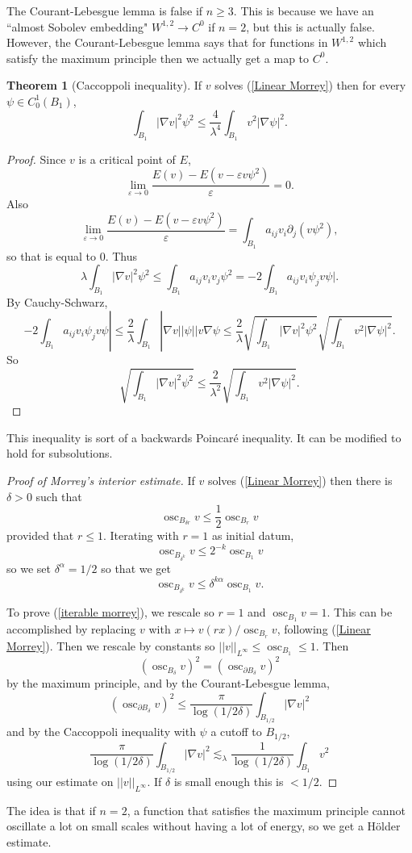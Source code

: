 \documentclass[12pt]{book}
\DeclareMathOperator{\osc}{osc}
\theoremstyle{definition}
\newtheorem{theorem}{Theorem}[chapter]
\begin{document}
The Courant-Lebesgue lemma is false if $n \geq 3$.
This is because we have an ``almost Sobolev embedding" $W^{1,2} \to C^0$ if $n = 2$, but this is actually false.
However, the Courant-Lebesgue lemma says that for functions in $W^{1,2}$ which satisfy the maximum principle then we actually get a map to $C^0$.

\begin{theorem}[Caccoppoli inequality]
If $v$ solves (\ref{Linear Morrey}) then for every $\psi \in C^1_0(B_1)$,
$$\int_{B_1} |\nabla v|^2 \psi^2 \leq \frac{4}{\lambda^4} \int_{B_1} v^2 |\nabla \psi|^2.$$
\end{theorem}
\begin{proof}
Since $v$ is a critical point of $E$,
$$\lim_{\varepsilon \to 0} \frac{E(v) - E(v - \varepsilon v\psi^2)}{\varepsilon} = 0.$$
Also
$$\lim_{\varepsilon \to 0}  \frac{E(v) - E(v - \varepsilon v\psi^2)}{\varepsilon} = \int_{B_1} a_{ij} v_i\partial_j(v\psi^2),$$
so that is equal to $0$.
Thus
$$\lambda \int_{B_1} |\nabla v|^2 \psi^2 \leq \int_{B_1} a_{ij} v_i v_j \psi^2 = -2\int_{B_1} a_{ij}v_i\psi_j v\psi|.$$
By Cauchy-Schwarz,
$$-2\int_{B_1} a_{ij}v_i\psi_j v\psi| \leq \frac{2}{\lambda} \int_{B_1} |\nabla v||\psi||v\nabla \psi \leq \frac{2}{\lambda} \sqrt{\int_{B_1} |\nabla v|^2 \psi^2} \sqrt{\int_{B_1} v^2 |\nabla \psi|^2}.$$
So
$$\sqrt{\int_{B_1} |\nabla v|^2 \psi^2} \leq \frac{2}{\lambda^2} \sqrt{\int_{B_1} v^2 |\nabla \psi|^2}.$$
\end{proof}
This inequality is sort of a backwards Poincar\'e inequality.
It can be modified to hold for subsolutions.

\begin{proof}[Proof of Morrey's interior estimate]
If $v$ solves (\ref{Linear Morrey}) then there is $\delta > 0$ such that
\begin{equation}
\label{iterable morrey}
\osc_{B_{\delta r}} v \leq \frac{1}{2} \osc_{B_r} v
\end{equation}
provided that $r \leq 1$.
Iterating with $r = 1$ as initial datum,
$$\osc_{B_{\delta^k}} v \leq 2^{-k} \osc_{B_1} v$$
so we set $\delta^\alpha = 1/2$ so that we get
$$\osc_{B_{\delta^k}} v \leq \delta^{k\alpha} \osc_{B_1} v.$$

To prove (\ref{iterable morrey}), we rescale so $r = 1$ and $\osc_{B_1} v = 1$.
This can be accomplished by replacing $v$ with $x \mapsto v(rx)/\osc_{B_r} v$, following (\ref{Linear Morrey}).
Then we rescale by constants so $||v||_{L^\infty} \leq \osc_{B_1} \leq 1$.
Then
$$\left(\osc_{B_\delta} v\right)^2 = \left(\osc_{\partial B_\delta} v\right)^2$$
by the maximum principle, and by the Courant-Lebesgue lemma,
$$\left(\osc_{\partial B_\delta} v\right)^2 \leq \frac{\pi}{\log(1/2\delta)} \int_{B_{1/2}} |\nabla v|^2$$
and by the Caccoppoli inequality with $\psi$ a cutoff to $B_{1/2}$,
$$\frac{\pi}{\log(1/2\delta)} \int_{B_{1/2}} |\nabla v|^2 \lesssim_\lambda \frac{1}{\log(1/2\delta)} \int_{B_1} v^2$$
using our estimate on $||v||_{L^\infty}$. If $\delta$ is small enough this is $<1/2$.
\end{proof}

The idea is that if $n = 2$, a function that satisfies the maximum principle cannot oscillate a lot on small scales without having a lot of energy, so we get a H\"older estimate.





\newpage
\printindex
\printbibliography
\end{document}
